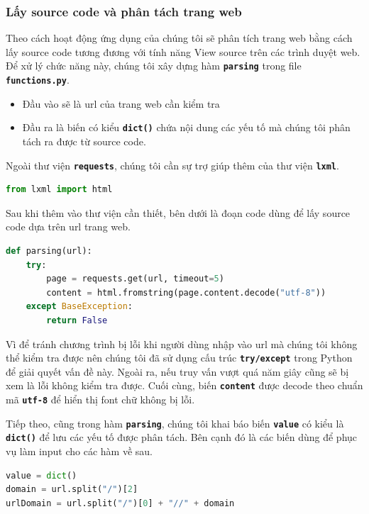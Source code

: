 \subsubsection{Lấy source code và phân tách trang web}
Theo cách hoạt động ứng dụng của chúng tôi sẽ phân tích trang web bằng cách lấy source code tương đương với tính năng View source trên các trình duyệt web. Để xử lý chức năng này, chúng tôi xây dựng hàm \textbf{\texttt{parsing}} trong file \textbf{\texttt{functions.py}}.
\begin{itemize}
    \item Đầu vào sẽ là url của trang web cần kiểm tra
    \item Đầu ra là biến có kiểu \textbf{\texttt{dict()}} chứa nội dung các yếu tố mà chúng tôi phân tách ra được từ source code.
\end{itemize}
\par
Ngoài thư viện \textbf{\texttt{requests}}, chúng tôi cần sự trợ giúp thêm của thư viện \textbf{\texttt{lxml}}.
\begin{lstlisting}[language=Python]
from lxml import html
\end{lstlisting}
\par
Sau khi thêm vào thư viện cần thiết, bên dưới là đoạn code dùng để lấy source code dựa trên url trang web.
\begin{lstlisting}[language=Python]
def parsing(url):
    try:
        page = requests.get(url, timeout=5)
        content = html.fromstring(page.content.decode("utf-8"))
    except BaseException:
        return False
\end{lstlisting}
\par
Vì để tránh chương trình bị lỗi khi người dùng nhập vào url mà chúng tôi không thể kiểm tra được nên chúng tôi đã sử dụng cấu trúc \textbf{\texttt{try/except}} trong Python để giải quyết vấn đề này. Ngoài ra, nếu truy vấn vượt quá năm giây cũng sẽ bị xem là lỗi không kiểm tra được. Cuối cùng, biến \textbf{\texttt{content}} được decode theo chuẩn mã \textbf{\texttt{utf-8}} để hiển thị font chữ không bị lỗi.
\par
Tiếp theo, cũng trong hàm \textbf{\texttt{parsing}}, chúng tôi khai báo biến \textbf{\texttt{value}} có kiểu là \textbf{\texttt{dict()}} để lưu các yếu tố được phân tách. Bên cạnh đó là các biến dùng để phục vụ làm input cho các hàm về sau.
\begin{lstlisting}[language=Python]
value = dict()
domain = url.split("/")[2]
urlDomain = url.split("/")[0] + "//" + domain    
\end{lstlisting}
